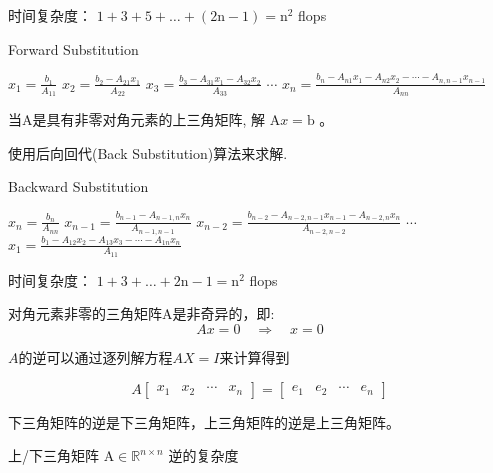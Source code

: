 时间复杂度： $ 1+3+5+\ldots+(2 \mathrm{n}-1)=\mathrm{n}^{2} $ flops

\begin{algorithm}[htbp]
    \caption{Forward Substitution}
    $ x_{1}= \frac{b_{1} }{A_{11} }  $\;
$ x_{2}=\frac{b_{2}-A_{21} x_{1}}{A_{22}}$\;
$  x_{3} =\frac{b_{3}-A_{31} x_{1}-A_{32} x_{2}}{A_{33}} $ \;
    $\cdots$  \;
    $x_{n} =
    \frac{b_{n}-A_{n 1} x_{1}-A_{n 2} x_{2}-\cdots-A_{n, n-1} x_{n-1}}{A_{n n}} $\;
\end{algorithm}

\begin{problem}
    当A是具有非零对角元素的上三角矩阵, 解 $ \mathrm{A} x=\mathrm{b} $ 。
\end{problem}

使用后向回代(Back Substitution)算法来求解.

\begin{algorithm}[htbp]
    \caption{Backward Substitution}

    $ x_{n}= \frac{b_{n}}{A_{n n}} $\;
    $ x_{n-1}= \frac{b_{n-1}-A_{n-1, n} x_{n}}{A_{n-1, n-1}} $ \;
    $ x_{n-2}= \frac{b_{n-2}-A_{n-2, n-1} x_{n-1}-A_{n-2, n} x_{n}}{ A_{n-2, n-2}} $\;
    $\cdots$\;
    $ x_{1}=\frac{b_{1}-A_{12} x_{2}-A_{13} x_{3}-\cdots-A_{1 n} x_{n}}{A_{11}}  $\;
\end{algorithm}

时间复杂度： $ 1+3+\ldots+2 \mathrm{n}-1=\mathrm{n}^{2} $ flops

\begin{theorem}
    对角元素非零的三角矩阵A是非奇异的，即:
$$
A x=0 \quad \Rightarrow \quad x=0
$$
\end{theorem}

\begin{theorem}[高斯消元法]
    $A$的逆可以通过逐列解方程$AX=I$来计算得到

    $$ A\left[\begin{array}{llll}x_{1} & x_{2} & \cdots & x_{n}\end{array}\right]=\left[\begin{array}{llll}e_{1} & e_{2} & \cdots & e_{n}\end{array}\right] $$
\end{theorem}

\begin{theorem}
    下三角矩阵的逆是下三角矩阵，上三角矩阵的逆是上三角矩阵。
\end{theorem}

上/下三角矩阵 $ \mathrm{A} \in \mathbb{R}^{n \times n} $ 逆的复杂度

